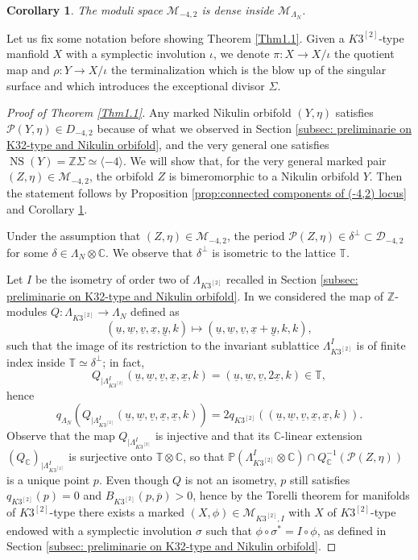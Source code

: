 \documentclass{amsart}
\newtheorem{cor}[thm]{Corollary}
\theoremstyle{definition}
\numberwithin{equation}{section}
\numberwithin{equation}{section} \theoremstyle{definition}
\DeclareMathOperator{\NS}{NS}
\newcommand\C{{\mathbb{C}  }}
\newcommand{\ra}{\rightarrow}
\begin{document}
\begin{cor}\label{cor:density}
The moduli space $\mathcal{M}_{-4,2}$ is dense inside $\mathcal{M}_{\Lambda_N}$.
\end{cor}

Let us fix some notation before showing Theorem \ref{Thm1.1}. Given a $K3^{[2]}$-type manfiold $X$ with a symplectic involution $\iota$, we denote $\pi \colon X\ra X/\iota$ the quotient map and $\rho:Y\ra X/\iota$ the terminalization which is the blow up of the singular surface and which introduces the exceptional divisor $\Sigma$.

\begin{proof}[Proof of Theorem \ref{Thm1.1}] Any marked Nikulin orbifold $(Y,\eta)$ satisfies $\mathcal{P}(Y,\eta)\in D_{-4,2}$ because of what we observed in Section \ref{subsec: preliminarie on K32-type and Nikulin orbifold}, and the very general one satisfies $\NS(Y)=\mathbb{Z}\Sigma\simeq\langle -4\rangle$.
We will show that, for the very general marked pair $(Z,\eta)\in \mathcal{M}_{-4,2}$, the orbifold $Z$ is bimeromorphic to a Nikulin orbifold $Y$. Then the statement follows by Proposition \ref{prop:connected components of (-4,2) locus} and Corollary \ref{cor:density}.

Under the assumption that $(Z,\eta)\in \mathcal{M}_{-4,2}$, the period $\mathcal{P}(Z,\eta)\in \delta^\perp\subset\mathcal{D}_{-4,2}$ for some $\delta\in\Lambda_N\otimes \mathbb{C}$. We observe that $\delta^\perp$ is isometric to the lattice $\mathbb{T}$.

Let $I$ be the isometry  of order two of $\Lambda_{K3^{[2]}}$ recalled in Section \ref{subsec: preliminarie on K32-type and Nikulin orbifold}. 
In \cite[Section 3.1]{CGKK} we considered the map of $\mathbb{Z}$-modules $Q:\Lambda_{K3^{[2]}}\rightarrow \Lambda_N$ defined  as
\[
(\underline{u},\underline{w},\underline{v},\underline{x},\underline{y},k)\mapsto(\underline{u},\underline{w},\underline{v},\underline{x}+\underline{y},k,k),
\]
such that the image of its restriction to the invariant sublattice $\Lambda_{K3^{[2]}}^I$ is of finite index inside $\mathbb{T}\simeq \delta^\perp$;
 in fact,$$Q_{|\Lambda_{K3^{[2]}}^I}(\underline{u},\underline{w},\underline{v},\underline{x},\underline{x},k)=(\underline{u},\underline{w},\underline{v},2\underline{x},k)\in \mathbb{T},$$ hence \[q_{\Lambda_N}(Q_{|\Lambda_{K3^{[2]}}^I}(\underline{u},\underline{w},\underline{v},\underline{x},\underline{x},k))=2q_{K3^{[2]}}((\underline{u},\underline{w},\underline{v},\underline{x},\underline{x},k)).\]
Observe that the map $Q_{|\Lambda_{{K3}^{[2]}}^I}$ is injective and that its $\C$-linear extension $(Q_\C)_{|\Lambda_{{K3}^{[2]}}^I}$ is surjective onto $\mathbb{T}\otimes \C$, so that $\mathbb{P}(\Lambda_{K3^{[2]}}^I\otimes \mathbb{C})\cap Q_{\mathbb{C}}^{-1}(\mathcal{P}(Z,\eta))$ is a unique point $p$. Even though $Q$ is not an isometry, $p$ still satisfies $q_{K3^{[2]}}(p)=0$ and $B_{K3^{[2]}}(p,\overline{p})>0$, hence by the Torelli theorem for manifolds of $K3^{[2]}$-type there exists a marked $(X,\phi)\in\mathcal{M}_{K3^{[2]},I}$  with $X$ of $K3^{[2]}$-type endowed with a symplectic involution $\sigma$ such that  $\phi\circ\sigma^*=I\circ \phi$, as defined in Section \ref{subsec: preliminarie on K32-type and Nikulin orbifold}. 


\end{proof}
\end{document}
